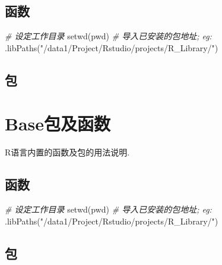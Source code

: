 \documentclass[
]{book}
\newenvironment{Shaded}{\begin{snugshade}}{\end{snugshade}}
\newcommand{\CommentTok}[1]{\textcolor[rgb]{0.56,0.35,0.01}{\textit{#1}}}
\newcommand{\FunctionTok}[1]{\textcolor[rgb]{0.00,0.00,0.00}{#1}}
\newcommand{\NormalTok}[1]{#1}
\newcommand{\StringTok}[1]{\textcolor[rgb]{0.31,0.60,0.02}{#1}}
\begin{document}
\hypertarget{ux51fdux6570-1}{%
\section{函数}\label{ux51fdux6570-1}}

\begin{Shaded}
\begin{Highlighting}[]
\CommentTok{\# 设定工作目录}
\FunctionTok{setwd}\NormalTok{(pwd)}
\CommentTok{\# 导入已安装的包地址; eg:}
\FunctionTok{.libPaths}\NormalTok{(}\StringTok{"/data1/Project/Rstudio/projects/R\_Library/"}\NormalTok{)}
\end{Highlighting}
\end{Shaded}

\hypertarget{ux5305-1}{%
\section{包}\label{ux5305-1}}

\hypertarget{baseux5305ux53caux51fdux6570-2}{%
\chapter{Base包及函数}\label{baseux5305ux53caux51fdux6570-2}}

R语言内置的函数及包的用法说明.

\hypertarget{ux51fdux6570-2}{%
\section{函数}\label{ux51fdux6570-2}}

\begin{Shaded}
\begin{Highlighting}[]
\CommentTok{\# 设定工作目录}
\FunctionTok{setwd}\NormalTok{(pwd)}
\CommentTok{\# 导入已安装的包地址; eg:}
\FunctionTok{.libPaths}\NormalTok{(}\StringTok{"/data1/Project/Rstudio/projects/R\_Library/"}\NormalTok{)}
\end{Highlighting}
\end{Shaded}

\hypertarget{ux5305-2}{%
\section{包}\label{ux5305-2}}

  
\end{document}
